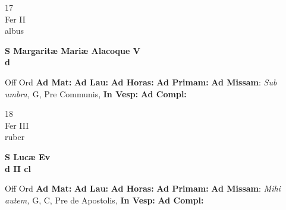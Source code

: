 \documentclass[10pt, openany]{book}
\begin{document}
    \begin{center}
        \begin{minipage}{3.5in}
            \vspace{2em}
            \begin{minipage}{0.5in}
                {\Huge 17} \\
                {\normalsize Fer II} \\
                {\normalsize albus}
            \end{minipage}
            \begin{minipage}{3.0in}
                \textbf{ \large S Margaritæ Mariæ Alacoque V \\
                \textnormal{\normalsize d}} \\ 
            \end{minipage}
            \begin{justify}Off Ord
                \textbf{Ad Mat: }
                \textbf{Ad Lau: }
                \textbf{Ad Horas: }
                \textbf{Ad Primam: }\textbf{Ad Missam}: \textit{Sub umbra,} G, Pre Communis,  
                \textbf{In Vesp: }
                \textbf{Ad Compl: }
            \end{justify}
        \end{minipage}
    \end{center}

    \begin{center}
        \begin{minipage}{3.5in}
            \vspace{2em}
            \begin{minipage}{0.5in}
                {\Huge 18} \\
                {\normalsize Fer III} \\
                {\normalsize ruber}
            \end{minipage}
            \begin{minipage}{3.0in}
                \textbf{ \large S Lucæ Ev \\
                \textnormal{\normalsize d II cl}} \\ 
            \end{minipage}
            \begin{justify}Off Ord
                \textbf{Ad Mat: }
                \textbf{Ad Lau: }
                \textbf{Ad Horas: }
                \textbf{Ad Primam: }\textbf{Ad Missam}: \textit{Mihi autem,} G, C, Pre de Apostolis,  
                \textbf{In Vesp: }
                \textbf{Ad Compl: }
            \end{justify}
        \end{minipage}
    \end{center}
\end{document}
